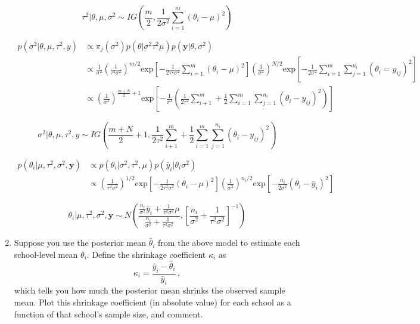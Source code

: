 \documentclass[10pt]{article}
\begin{document}
\begin{enumerate}
        $$\tau^2 | \theta, \mu, \sigma^2 \sim IG\left(\frac{m}{2}, \frac{1}{2\sigma^2 } \sum_{i=1}^m (\theta_i - \mu)^2 \right)$$

        \begin{align*}
            p(\sigma^2 | \theta, \mu, \tau^2, y) &\propto \pi_j(\sigma^2) p(\theta|\sigma^2 \tau^2 \mu) p(\mathbf{y}| \theta, \sigma^2) \\
            &\propto \frac{1}{\sigma^2} \left(\frac{1}{\tau^2 \sigma^2} \right)^{m/2} \text{exp}\left[-\frac{1}{2\tau^2 \sigma^2} \sum_{i=1}^m (\theta_i - \mu)^2 \right] \left(\frac{1}{\sigma^2}\right)^{N/2} \text{exp}\left[-\frac{1}{2\sigma^2} \sum_{i=1}^m \sum_{j=1}^{n_i} (\theta_i = y_{ij})^2 \right] \\
            &\propto \left(\frac{1}{\sigma^2} \right)^{\frac{m+N}{2} + 1} \text{exp}\left[-\frac{1}{\sigma^2} \left( \frac{1}{2\tau^2} \sum_{i+1}^m + \frac{1}{2} \sum_{i=1}^m \sum_{j=1}^{n_i} (\theta_i - y_{ij})^2 \right) \right]
        \end{align*}

        $$\sigma^2 | \theta, \mu, \tau^2, y \sim IG\left(\frac{m+N}{2} + 1, \frac{1}{2\tau^2} \sum_{i+1}^m + \frac{1}{2} \sum_{i=1}^m \sum_{j=1}^{n_i} (\theta_i - y_{ij})^2 \right)$$

        \begin{align*}
            p(\theta_i | \mu, \tau^2, \sigma^2, \mathbf{y}) &\propto p(\theta_i | \sigma^2, \tau^2, \mu) p(\bar{y}_i | \theta_i \sigma^2) \\
            &\propto \left(\frac{1}{\tau^2 \sigma^2} \right)^{1/2} \text{exp}\left[-\frac{1}{2 \tau^2 \sigma^2} (\theta_i - \mu)^2 \right] \left( \frac{1}{\sigma^2}\right)^{n_i/2} \text{exp}\left[-\frac{n_i}{2 \sigma^2} (\theta_i - \bar{y}_i)^2 \right]
        \end{align*}

        $$\theta_i | \mu, \tau^2, \sigma^2, \mathbf{y} \sim N \left( \frac{\frac{n_i}{\sigma^2} \bar{y}_i + \frac{1}{\tau^2 \sigma^2} \mu}{\frac{n_i}{\sigma^2} + \frac{1}{\tau^2 \sigma^2}}, \left[ \frac{n_i}{\sigma^2} + \frac{1}{\tau^2 \sigma^2}\right]^{-1} \right)$$

        \item Suppose you use the posterior mean $\hat{\theta}_i$ from the above model to estimate each school-level mean $\theta_i$.  Define the shrinkage coefficient $\kappa_i$ as
        $$
        \kappa_i = \frac{ \bar{y}_i - \hat{\theta}_i}{\bar{y}_i} \, ,
        $$
        which tells you how much the posterior mean shrinks the observed sample mean.  Plot this shrinkage coefficient (in absolute value) for each school as a function of that school's sample size, and comment.

    \end{enumerate}
\end{document}
